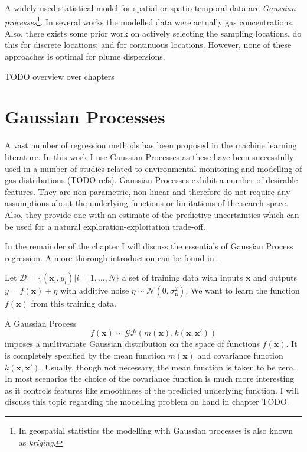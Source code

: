 \documentclass[11pt,a4paper]{scrreprt}
\newcommand{\vc}[1]{\bm{#1}}
\newcommand{\newterm}[1]{\emph{#1}}
\begin{document}
A widely used statistical model for spatial or spatio-temporal data are 
\newterm{Gaussian processes}\footnote{In geospatial statistics the modelling 
    with Gaussian processes is also known as \newterm{kriging}.}. In several 
works \parencite[e.g.][]{Stachniss:2008vz, Marchant:2012wb} the modelled data 
were actually gas concentrations. Also, there exists some prior work on actively 
selecting the sampling locations. \Textcite{Stranders:2008wl} do this for 
discrete locations; \textcite{Singh:2010wt} and \textcite{Marchant:2012wb} for 
continuous locations. However, none of these approaches is optimal for plume 
dispersions.

TODO overview over chapters

\chapter{Gaussian Processes}
A vast number of regression methods has been proposed in the machine learning 
literature. In this work I use Gaussian Processes as these have been 
successfully used in a number of studies related to environmental monitoring and 
modelling of gas distributions (TODO refs). Gaussian Processes exhibit a number 
of desirable features. They are non-parametric, non-linear and therefore do not 
require any assumptions about the underlying functions or limitations of the 
search space. Also, they provide one with an estimate of the predictive 
uncertainties which can be used for a natural exploration-exploitation 
trade-off.

In the remainder of the chapter I will discuss the essentials of Gaussian 
Process regression. A more thorough introduction can be found in 
\textcite{Rasmussen:2006vz}.

Let $\mathcal{D} = \{(\vc{x}_i, y_i) | i = 1, \dots, N\}$ a set of training data 
with inputs $\vc x$ and outputs $y = f(\vc x) + \eta$ with additive noise $\eta 
\sim \mathcal{N}(0, \sigma_{\text{n}}^2)$. We want to learn the function $f(\vc 
x)$ from this training data.

A Gaussian Process
\begin{equation}
    f(\vc x) \sim \mathcal{GP}(m(\vc x), k(\vc x, \vc x'))
\end{equation}
imposes a multivariate Gaussian distribution on the space of functions $f(\vc 
x)$. It is completely specified by the mean function $m(\vc x)$ and covariance 
function $k(\vc x, \vc x')$. Usually, though not necessary, the mean function is 
taken to be zero. In most scenarios the choice of the covariance function is 
much more interesting as it controls features like smoothness of the predicted 
underlying function. I will discuss this topic regarding the modelling problem 
on hand in chapter TODO.
\end{document}
